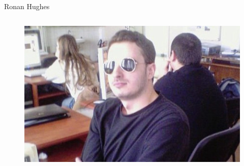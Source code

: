\documentclass[nobackground,dvipsnames,table]{beamer}
\begin{document}
\begin{frame}{Ronan Hughes}
\begin{columns}
            \begin{figure}
                \centering
                \includegraphics[width=\textwidth]{ronan-hughes-photo}
            \end{figure}
    \end{columns}
\end{frame}
\end{document}
